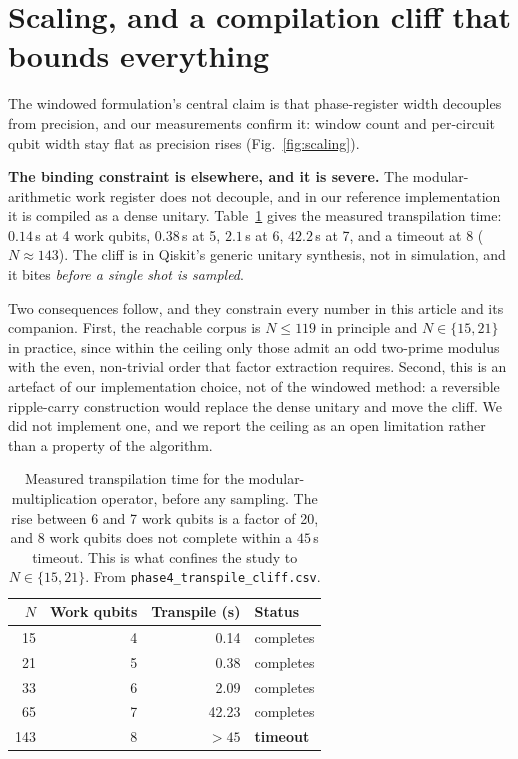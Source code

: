 \section{Scaling, and a compilation cliff that bounds everything}
\label{sec:cliff}

The windowed formulation's central claim is that phase-register width
decouples from precision, and our measurements confirm it: window count and
per-circuit qubit width stay flat as precision rises
(Fig.~\ref{fig:scaling}).

\textbf{The binding constraint is elsewhere, and it is severe.} The
modular-arithmetic work register does not decouple, and in our reference
implementation it is compiled as a dense unitary. Table~\ref{tab:cliff}
gives the measured transpilation time: $0.14$\,s at 4 work qubits,
$0.38$\,s at 5, $2.1$\,s at 6, $42.2$\,s at 7, and a timeout at 8
($N\approx143$). The cliff is in Qiskit's generic unitary synthesis, not in
simulation, and it bites \emph{before a single shot is sampled}.

Two consequences follow, and they constrain every number in this article and
its companion. First, the reachable corpus is $N\le119$ in principle and
$N\in\{15,21\}$ in practice, since within the ceiling only those admit an odd
two-prime modulus with the even, non-trivial order that factor extraction
requires. Second, this is an artefact of our implementation choice, not of
the windowed method: a reversible ripple-carry construction
\cite{cuccaro2004} would replace the dense unitary and move the cliff. We
did not implement one, and we report the ceiling as an open limitation
rather than a property of the algorithm.

\begin{table}[htbp]
\centering\small
\caption{Measured transpilation time for the modular-multiplication
operator, before any sampling. The rise between 6 and 7 work qubits is a
factor of 20, and 8 work qubits does not complete within a $45$\,s timeout.
This is what confines the study to $N\in\{15,21\}$. From
\texttt{phase4\_transpile\_cliff.csv}.}
\label{tab:cliff}
\begin{tabular}{@{}rrrl@{}}
\toprule
$N$ & Work qubits & Transpile (s) & Status \\
\midrule
15  & 4 & 0.14  & completes \\
21  & 5 & 0.38  & completes \\
33  & 6 & 2.09  & completes \\
65  & 7 & 42.23 & completes \\
143 & 8 & $>45$ & \textbf{timeout} \\
\bottomrule
\end{tabular}
\end{table}

